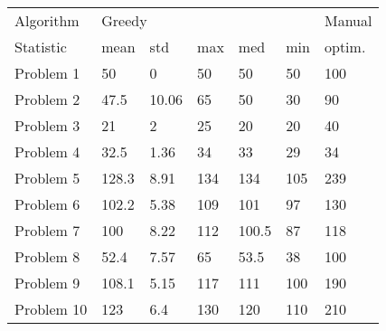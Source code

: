 \begin{tabular}{lllllll}
\toprule
Algorithm & \multicolumn{5}{l}{Greedy} & Manual \\
Statistic &   mean &    std &  max &    med &  min & optim. \\
\midrule
Problem 1  &     50 &      0 &   50 &     50 &   50 &    100 \\
Problem 2  &   47.5 &  10.06 &   65 &     50 &   30 &     90 \\
Problem 3  &     21 &      2 &   25 &     20 &   20 &     40 \\
Problem 4  &   32.5 &   1.36 &   34 &     33 &   29 &     34 \\
Problem 5  &  128.3 &   8.91 &  134 &    134 &  105 &    239 \\
Problem 6  &  102.2 &   5.38 &  109 &    101 &   97 &    130 \\
Problem 7  &    100 &   8.22 &  112 &  100.5 &   87 &    118 \\
Problem 8  &   52.4 &   7.57 &   65 &   53.5 &   38 &    100 \\
Problem 9  &  108.1 &   5.15 &  117 &    111 &  100 &    190 \\
Problem 10 &    123 &    6.4 &  130 &    120 &  110 &    210 \\
\bottomrule
\end{tabular}
